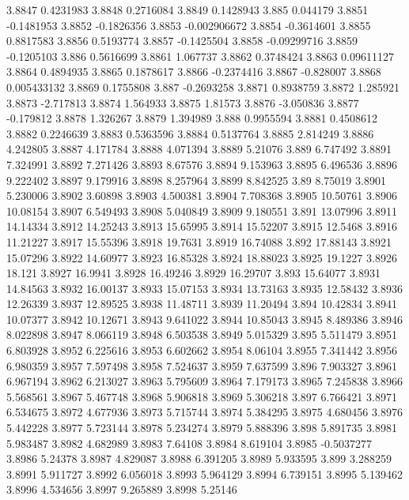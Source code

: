 3.8847  0.4231983
3.8848  0.2716084
3.8849  0.1428943
3.885  0.044179
3.8851  -0.1481953
3.8852  -0.1826356
3.8853  -0.002906672
3.8854  -0.3614601
3.8855  0.8817583
3.8856  0.5193774
3.8857  -0.1425504
3.8858  -0.09299716
3.8859  -0.1205103
3.886  0.5616699
3.8861  1.067737
3.8862  0.3748424
3.8863  0.09611127
3.8864  0.4894935
3.8865  0.1878617
3.8866  -0.2374416
3.8867  -0.828007
3.8868  0.005433132
3.8869  0.1755808
3.887  -0.2693258
3.8871  0.8938759
3.8872  1.285921
3.8873  -2.717813
3.8874  1.564933
3.8875  1.81573
3.8876  -3.050836
3.8877  -0.179812
3.8878  1.326267
3.8879  1.394989
3.888  0.9955594
3.8881  0.4508612
3.8882  0.2246639
3.8883  0.5363596
3.8884  0.5137764
3.8885  2.814249
3.8886  4.242805
3.8887  4.171784
3.8888  4.071394
3.8889  5.21076
3.889  6.747492
3.8891  7.324991
3.8892  7.271426
3.8893  8.67576
3.8894  9.153963
3.8895  6.496536
3.8896  9.222402
3.8897  9.179916
3.8898  8.257964
3.8899  8.842525
3.89  8.75019
3.8901  5.230006
3.8902  3.60898
3.8903  4.500381
3.8904  7.708368
3.8905  10.50761
3.8906  10.08154
3.8907  6.549493
3.8908  5.040849
3.8909  9.180551
3.891  13.07996
3.8911  14.14334
3.8912  14.25243
3.8913  15.65995
3.8914  15.52207
3.8915  12.5468
3.8916  11.21227
3.8917  15.55396
3.8918  19.7631
3.8919  16.74088
3.892  17.88143
3.8921  15.07296
3.8922  14.60977
3.8923  16.85328
3.8924  18.88023
3.8925  19.1227
3.8926  18.121
3.8927  16.9941
3.8928  16.49246
3.8929  16.29707
3.893  15.64077
3.8931  14.84563
3.8932  16.00137
3.8933  15.07153
3.8934  13.73163
3.8935  12.58432
3.8936  12.26339
3.8937  12.89525
3.8938  11.48711
3.8939  11.20494
3.894  10.42834
3.8941  10.07377
3.8942  10.12671
3.8943  9.641022
3.8944  10.85043
3.8945  8.489386
3.8946  8.022898
3.8947  8.066119
3.8948  6.503538
3.8949  5.015329
3.895  5.511479
3.8951  6.803928
3.8952  6.225616
3.8953  6.602662
3.8954  8.06104
3.8955  7.341442
3.8956  6.980359
3.8957  7.597498
3.8958  7.524637
3.8959  7.637599
3.896  7.903327
3.8961  6.967194
3.8962  6.213027
3.8963  5.795609
3.8964  7.179173
3.8965  7.245838
3.8966  5.568561
3.8967  5.467748
3.8968  5.906818
3.8969  5.306218
3.897  6.766421
3.8971  6.534675
3.8972  4.677936
3.8973  5.715744
3.8974  5.384295
3.8975  4.680456
3.8976  5.442228
3.8977  5.723144
3.8978  5.234274
3.8979  5.888396
3.898  5.891735
3.8981  5.983487
3.8982  4.682989
3.8983  7.64108
3.8984  8.619104
3.8985  -0.5037277
3.8986  5.24378
3.8987  4.829087
3.8988  6.391205
3.8989  5.933595
3.899  3.288259
3.8991  5.911727
3.8992  6.056018
3.8993  5.964129
3.8994  6.739151
3.8995  5.139462
3.8996  4.534656
3.8997  9.265889
3.8998  5.25146
